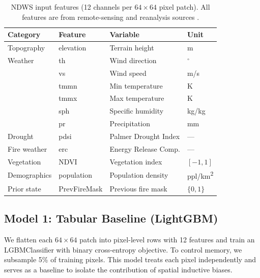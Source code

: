 \documentclass{article}
\begin{document}
\begin{table}[t]
    \caption{NDWS input features (12 channels per $64{\times}64$ pixel patch).  All features are from remote-sensing and reanalysis sources \citep{huot2022next}.}
    \label{tab:features}
    \centering
    \footnotesize
    \setlength{\tabcolsep}{3pt}
    \begin{tabular}{llll}
        \toprule
        Category     & Feature      & Variable             & Unit                      \\
        \midrule
        Topography   & elevation    & Terrain height       & m                         \\
        \midrule
        Weather      & th           & Wind direction       & $^\circ$                  \\
                     & vs           & Wind speed           & m/s                       \\
                     & tmmn         & Min temperature      & K                         \\
                     & tmmx         & Max temperature      & K                         \\
                     & sph          & Specific humidity    & kg/kg                     \\
                     & pr           & Precipitation        & mm                        \\
        \midrule
        Drought      & pdsi         & Palmer Drought Index & ---                       \\
        Fire weather & erc          & Energy Release Comp. & ---                       \\
        Vegetation   & NDVI         & Vegetation index     & $[-1,1]$                  \\
        Demographics & population   & Population density   & ppl/km\textsuperscript{2} \\
        Prior state  & PrevFireMask & Previous fire mask   & $\{0,1\}$                 \\
        \bottomrule
    \end{tabular}
\end{table}

\subsection{Model 1: Tabular Baseline (LightGBM)}

We flatten each $64{\times}64$ patch into pixel-level rows with 12 features and train an LGBMClassifier \citep{ke2017lightgbm} with binary cross-entropy objective.
To control memory, we subsample 5\% of training pixels.
This model treats each pixel independently and serves as a baseline to isolate the contribution of spatial inductive biases.
\end{document}
